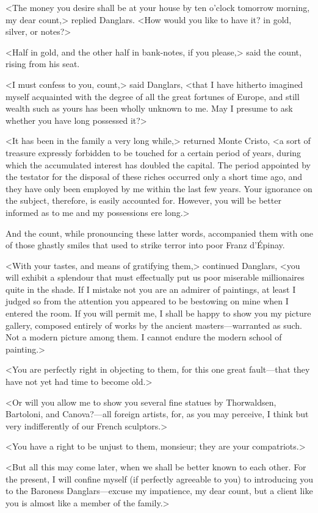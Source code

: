  <The money you desire shall be at your house by ten o'clock tomorrow morning, my dear count,> replied Danglars. <How would you like to have it? in gold, silver, or notes?> 

 <Half in gold, and the other half in bank-notes, if you please,> said the count, rising from his seat. 

 <I must confess to you, count,> said Danglars, <that I have hitherto imagined myself acquainted with the degree of all the great fortunes of Europe, and still wealth such as yours has been wholly unknown to me. May I presume to ask whether you have long possessed it?> 

 <It has been in the family a very long while,> returned Monte Cristo, <a sort of treasure expressly forbidden to be touched for a certain period of years, during which the accumulated interest has doubled the capital. The period appointed by the testator for the disposal of these riches occurred only a short time ago, and they have only been employed by me within the last few years. Your ignorance on the subject, therefore, is easily accounted for. However, you will be better informed as to me and my possessions ere long.> 

 And the count, while pronouncing these latter words, accompanied them with one of those ghastly smiles that used to strike terror into poor Franz d'Épinay. 

 <With your tastes, and means of gratifying them,> continued Danglars, <you will exhibit a splendour that must effectually put us poor miserable millionaires quite in the shade. If I mistake not you are an admirer of paintings, at least I judged so from the attention you appeared to be bestowing on mine when I entered the room. If you will permit me, I shall be happy to show you my picture gallery, composed entirely of works by the ancient masters—warranted as such. Not a modern picture among them. I cannot endure the modern school of painting.> 

 <You are perfectly right in objecting to them, for this one great fault—that they have not yet had time to become old.> 

 <Or will you allow me to show you several fine statues by Thorwaldsen, Bartoloni, and Canova?—all foreign artists, for, as you may perceive, I think but very indifferently of our French sculptors.> 

 <You have a right to be unjust to them, monsieur; they are your compatriots.> 

 <But all this may come later, when we shall be better known to each other. For the present, I will confine myself (if perfectly agreeable to you) to introducing you to the Baroness Danglars—excuse my impatience, my dear count, but a client like you is almost like a member of the family.> 

